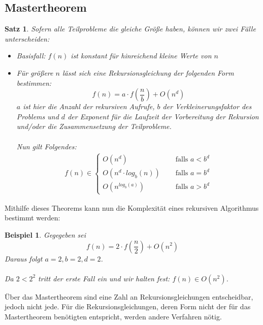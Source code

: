 \documentclass[11pt,a4paper]{scrartcl}
\newtheorem{satz}{Satz}
\newtheorem{example}{Beispiel}
\begin{document}
\subsection{Mastertheorem}
\begin{satz} Sofern alle Teilprobleme die gleiche Größe haben, können wir zwei Fälle unterscheiden: 
\begin{itemize}
\item Basisfall: $f(n)$ ist konstant für hinreichend kleine Werte von $n$
\item Für größere $n$ lässt sich eine Rekursionsgleichung der folgenden Form bestimmen: 
\[f(n) = a \cdot f(\frac{n}{b}) + O(n^{d})\]
$a$ ist hier die Anzahl der rekursiven Aufrufe, $b$ der Verkleinerungsfaktor des Problems und $d$ der Exponent für die Laufzeit der Vorbereitung der Rekursion und/oder die Zusammensetzung der Teilprobleme. \\\\
Nun gilt Folgendes: \\
\begin{align*}
f(n) \in 
\begin{cases}
O(n^{d}) \quad & \text{ falls } a < b^{d} \\
O(n^{d} \cdot log_{b}(n)) \quad & \text{ falls } a = b^{d} \\
O(n^{log_{b}(a)}) \quad & \text{ falls } a > b^{d}
\end{cases}
\end{align*}
\end{itemize}
\end{satz}
Mithilfe dieses Theorems kann nun die Komplexität eines rekursiven Algorithmus bestimmt werden:
\begin{example}
Gegegeben sei \[f(n) = 2 \cdot f(\frac{n}{2}) + O(n^{2})\] 
Daraus folgt $ a = 2, b = 2, d = 2$. \\\\
Da $2 < 2^{2}$ tritt der erste Fall ein und wir halten fest: $f(n) \in O(n^{2})$.
\end{example}
Über das Mastertheorem sind eine Zahl an Rekursionsgleichungen entscheidbar, jedoch nicht jede. Für die Rekursionsgleichungen, deren Form nicht der für das Mastertheorem benötigten entspricht, werden andere Verfahren nötig.
\end{document}

